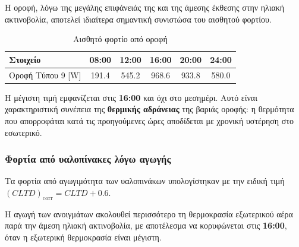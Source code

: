 \documentclass[12pt,a4paper]{article}
\begin{document}
Η οροφή, λόγω της μεγάλης επιφάνειάς της και της άμεσης έκθεσης στην ηλιακή
ακτινοβολία, αποτελεί ιδιαίτερα σημαντική συνιστώσα του αισθητού φορτίου.

\begin{table}[H]
\centering
\caption{Αισθητό φορτίο από οροφή}
\begin{tabular}{lccccc}
\toprule
\textbf{Στοιχείο} & \textbf{08:00} & \textbf{12:00} & \textbf{16:00} & \textbf{20:00} & \textbf{24:00} \\
\midrule
Οροφή Τύπου 9 [W] & 191.4 & 545.2 & 968.6 & 933.8 & 580.0 \\
\bottomrule
\end{tabular}
\end{table}

Η μέγιστη τιμή εμφανίζεται στις \textbf{16:00} και όχι στο μεσημέρι. Αυτό είναι
χαρακτηριστική συνέπεια της \textbf{θερμικής αδράνειας} της βαριάς οροφής: η
θερμότητα που απορροφάται κατά τις προηγούμενες ώρες αποδίδεται με χρονική υστέρηση
στο εσωτερικό.

\subsubsection{Φορτία από υαλοπίνακες λόγω αγωγής}

Τα φορτία από αγωγιμότητα των υαλοπινάκων υπολογίστηκαν με την ειδική τιμή
\((CLTD)_{\text{corr}} = CLTD + 0.6\).

\begin{table}[H]
\centering
\caption{Αισθητά φορτία από υαλοπίνακες λόγω αγωγής}
\end{table}

Η αγωγή των ανοιγμάτων ακολουθεί περισσότερο τη θερμοκρασία εξωτερικού αέρα παρά την
άμεση ηλιακή ακτινοβολία, με αποτέλεσμα να κορυφώνεται στις \textbf{16:00}, όταν η
εξωτερική θερμοκρασία είναι μέγιστη.
\end{document}
